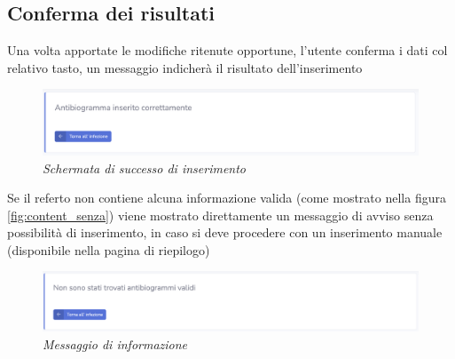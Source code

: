 \subsection{Conferma dei risultati}
Una volta apportate le modifiche ritenute opportune, l'utente conferma i dati col relativo tasto, un messaggio indicherà il risultato dell'inserimento
\begin{figure}[h!]
	\centering
	\includegraphics[width=.99\columnwidth]{images/confirm.png}
	\caption{\textit{Schermata di successo di inserimento}}
	\label{fig:confirm_success}
\end{figure}
\newline
Se il referto non contiene alcuna informazione valida (come mostrato nella figura \ref{fig:content_senza}) viene mostrato direttamente un messaggio di avviso senza possibilità di inserimento, in caso si deve procedere con un inserimento manuale (disponibile nella pagina di riepilogo)
\begin{figure}[h!]
	\centering
	\includegraphics[width=.99\columnwidth]{images/no_table.png}
	\caption{\textit{Messaggio di informazione}}
	\label{fig:info_no_table}
\end{figure}


